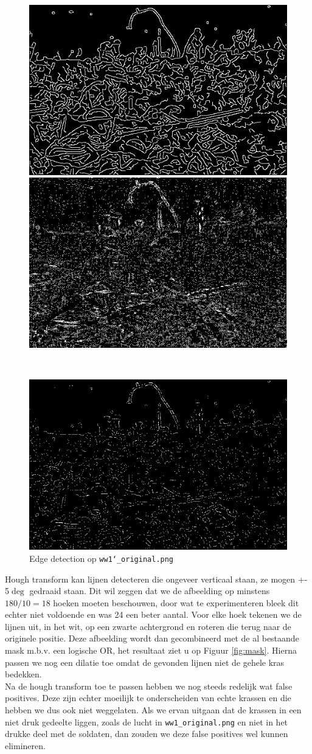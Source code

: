 \documentclass[titlepage]{article}
\begin{document}
\begin{figure}[H]
  \centering
  \begin{minipage}{\textwidth}
    \centering
    \captionsetup{justification=centering}
    \includegraphics[width=.4\textwidth]{canny}\quad
    \includegraphics[width=.4\textwidth]{binary_img}\quad
  \end{minipage}\\[1em]
  \begin{minipage}{\textwidth}
      \centering
    \includegraphics[width=.4\textwidth]{final_binary_img}
  \end{minipage}
  \caption{Edge detection op \texttt{ww1\char`_original.png}} \label{fig:edge_detection}
\end{figure}

Hough transform kan lijnen detecteren die ongeveer verticaal staan, ze mogen +- 5$\deg$ gedraaid staan. Dit wil zeggen dat we de afbeelding op minstens $180/10=18$ hoeken moeten beschouwen, door wat te experimenteren bleek dit echter niet voldoende en was 24 een beter aantal. Voor elke hoek tekenen we de lijnen uit, in het wit, op een zwarte achtergrond en roteren die terug naar de originele positie. Deze afbeelding wordt dan gecombineerd met de al bestaande mask m.b.v. een logische OR, het resultaat ziet u op Figuur \ref{fig:mask}. Hierna passen we nog een dilatie toe omdat de gevonden lijnen niet de gehele kras bedekken.\\
Na de hough transform toe te passen hebben we nog steeds redelijk wat false positives. Deze zijn echter moeilijk te onderscheiden van echte krassen en die hebben we dus ook niet weggelaten. Als we ervan uitgaan dat de krassen in een niet druk gedeelte liggen, zoals de lucht in \verb|ww1_original.png| en niet in het drukke deel met de soldaten, dan zouden we deze false positives wel kunnen elimineren.
\end{document}
